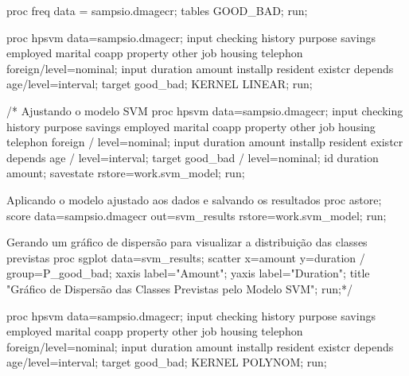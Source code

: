 \documentclass[
  a4paperpaper,
]{article}
\newenvironment{Shaded}{\begin{snugshade}}{\end{snugshade}}
\newcommand{\ErrorTok}[1]{\textcolor[rgb]{0.68,0.00,0.00}{#1}}
\newcommand{\NormalTok}[1]{\textcolor[rgb]{0.00,0.23,0.31}{#1}}
\newcommand{\OtherTok}[1]{\textcolor[rgb]{0.00,0.23,0.31}{#1}}
\newcommand{\SpecialCharTok}[1]{\textcolor[rgb]{0.37,0.37,0.37}{#1}}
\newcommand{\StringTok}[1]{\textcolor[rgb]{0.13,0.47,0.30}{#1}}
\begin{document}
\begin{Shaded}
\begin{Highlighting}[]
\NormalTok{proc freq data }\OtherTok{=}\NormalTok{ sampsio.dmagecr;}
\NormalTok{ tables GOOD\_BAD;}
\NormalTok{ run;}
 
 
\NormalTok{ proc hpsvm data}\OtherTok{=}\NormalTok{sampsio.dmagecr;}
\NormalTok{     input checking history purpose savings employed marital coapp}
\NormalTok{           property other job housing telephon foreign}\SpecialCharTok{/}\NormalTok{level}\OtherTok{=}\NormalTok{nominal;}
\NormalTok{     input duration amount installp resident existcr depends age}\SpecialCharTok{/}\NormalTok{level}\OtherTok{=}\NormalTok{interval;}
\NormalTok{     target good\_bad;}
\NormalTok{     KERNEL LINEAR;}
\NormalTok{ run;}

\SpecialCharTok{/}\ErrorTok{*}\NormalTok{ Ajustando o modelo SVM }
\NormalTok{proc hpsvm data}\OtherTok{=}\NormalTok{sampsio.dmagecr;}
\NormalTok{    input checking history purpose savings employed marital coapp}
\NormalTok{          property other job housing telephon foreign }\SpecialCharTok{/}\NormalTok{ level}\OtherTok{=}\NormalTok{nominal;}
\NormalTok{    input duration amount installp resident existcr depends age }\SpecialCharTok{/}\NormalTok{ level}\OtherTok{=}\NormalTok{interval;}
\NormalTok{    target good\_bad }\SpecialCharTok{/}\NormalTok{ level}\OtherTok{=}\NormalTok{nominal;}
\NormalTok{    id duration amount;}
\NormalTok{    savestate rstore}\OtherTok{=}\NormalTok{work.svm\_model;}
\NormalTok{run;}

\NormalTok{Aplicando o modelo ajustado aos dados e salvando os resultados }
\NormalTok{proc astore;}
\NormalTok{    score data}\OtherTok{=}\NormalTok{sampsio.dmagecr out}\OtherTok{=}\NormalTok{svm\_results rstore}\OtherTok{=}\NormalTok{work.svm\_model;}
\NormalTok{run;}

\NormalTok{Gerando um gráfico de dispersão para visualizar a distribuição das classes previstas }
\NormalTok{proc sgplot data}\OtherTok{=}\NormalTok{svm\_results;}
\NormalTok{    scatter x}\OtherTok{=}\NormalTok{amount y}\OtherTok{=}\NormalTok{duration }\SpecialCharTok{/}\NormalTok{ group}\OtherTok{=}\NormalTok{P\_good\_bad;}
\NormalTok{    xaxis label}\OtherTok{=}\StringTok{"Amount"}\NormalTok{;}
\NormalTok{    yaxis label}\OtherTok{=}\StringTok{"Duration"}\NormalTok{;}
\NormalTok{    title }\StringTok{"Gráfico de Dispersão das Classes Previstas pelo Modelo SVM"}\NormalTok{;}
\NormalTok{run;}\SpecialCharTok{*}\ErrorTok{/}

\NormalTok{ proc hpsvm data}\OtherTok{=}\NormalTok{sampsio.dmagecr;}
\NormalTok{     input checking history purpose savings employed marital coapp}
\NormalTok{           property other job housing telephon foreign}\SpecialCharTok{/}\NormalTok{level}\OtherTok{=}\NormalTok{nominal;}
\NormalTok{     input duration amount installp resident existcr depends age}\SpecialCharTok{/}\NormalTok{level}\OtherTok{=}\NormalTok{interval;}
\NormalTok{     target good\_bad;}
\NormalTok{     KERNEL POLYNOM;}
\NormalTok{ run;}
\end{Highlighting}
\end{Shaded}
\end{document}
